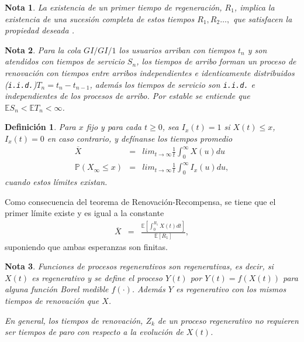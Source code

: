 \documentclass{article}
\newtheorem{Def}{Definición}[section]
\newtheorem{Note}{Nota}[section]
\newcommand{\esp}{\mathbb{E}}
\newcommand{\prob}{\mathbb{P}}
\numberwithin{equation}{section}
\begin{document}
\begin{Note}
La existencia de un primer tiempo de regeneraci\'on, $R_{1}$, implica la existencia de una sucesi\'on completa de estos tiempos $R_{1},R_{2}\ldots,$ que satisfacen la propiedad deseada \cite{Sigman2}.
\end{Note}


\begin{Note} Para la cola $GI/GI/1$ los usuarios arriban con tiempos $t_{n}$ y son atendidos con tiempos de servicio $S_{n}$, los tiempos de arribo forman un proceso de renovaci\'on  con tiempos entre arribos independientes e identicamente distribuidos (\texttt{i.i.d.})$T_{n}=t_{n}-t_{n-1}$, adem\'as los tiempos de servicio son \texttt{i.i.d.} e independientes de los procesos de arribo. Por \textit{estable} se entiende que $\esp S_{n}<\esp T_{n}<\infty$.
\end{Note}
 

\begin{Def}
Para $x$ fijo y para cada $t\geq0$, sea $I_{x}\left(t\right)=1$ si $X\left(t\right)\leq x$,  $I_{x}\left(t\right)=0$ en caso contrario, y def\'inanse los tiempos promedio
\begin{eqnarray}
\overline{X}&=&lim_{t\rightarrow\infty}\frac{1}{t}\int_{0}^{\infty}X\left(u\right)du\\
\prob\left(X_{\infty}\leq x\right)&=&lim_{t\rightarrow\infty}\frac{1}{t}\int_{0}^{\infty}I_{x}\left(u\right)du,
\end{eqnarray}
cuando estos l\'imites existan.
\end{Def}

Como consecuencia del teorema de Renovaci\'on-Recompensa, se tiene que el primer l\'imite  existe y es igual a la constante
\begin{eqnarray}
\overline{X}&=&\frac{\esp\left[\int_{0}^{R_{1}}X\left(t\right)dt\right]}{\esp\left[R_{1}\right]},
\end{eqnarray}
suponiendo que ambas esperanzas son finitas.

\begin{Note}
Funciones de procesos regenerativos son regenerativas, es decir, si $X\left(t\right)$ es regenerativo y se define el proceso $Y\left(t\right)$ por $Y\left(t\right)=f\left(X\left(t\right)\right)$ para alguna funci\'on Borel medible $f\left(\cdot\right)$. Adem\'as $Y$ es regenerativo con los mismos tiempos de renovaci\'on que $X$. 

En general, los tiempos de renovaci\'on, $Z_{k}$ de un proceso regenerativo no requieren ser tiempos de paro con respecto a la evoluci\'on de $X\left(t\right)$.
\end{Note} 
\end{document}
